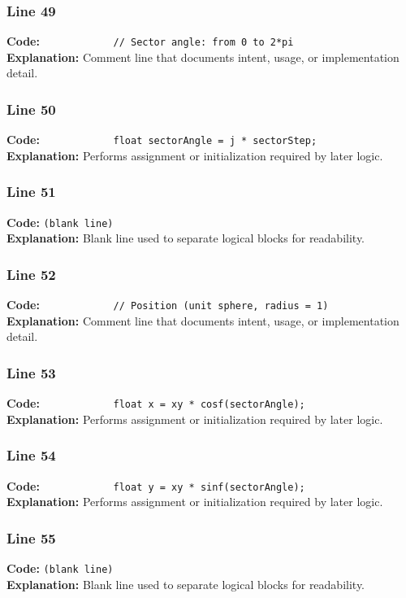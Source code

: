 \documentclass[11pt,a4paper]{article}
\begin{document}
\subsubsection*{Line 49}
\textbf{Code:} \verb|            // Sector angle: from 0 to 2*pi|\\
\textbf{Explanation:} Comment line that documents intent, usage, or implementation detail.

\subsubsection*{Line 50}
\textbf{Code:} \verb|            float sectorAngle = j * sectorStep;|\\
\textbf{Explanation:} Performs assignment or initialization required by later logic.

\subsubsection*{Line 51}
\textbf{Code:} \texttt{(blank line)}\\
\textbf{Explanation:} Blank line used to separate logical blocks for readability.

\subsubsection*{Line 52}
\textbf{Code:} \verb|            // Position (unit sphere, radius = 1)|\\
\textbf{Explanation:} Comment line that documents intent, usage, or implementation detail.

\subsubsection*{Line 53}
\textbf{Code:} \verb|            float x = xy * cosf(sectorAngle);|\\
\textbf{Explanation:} Performs assignment or initialization required by later logic.

\subsubsection*{Line 54}
\textbf{Code:} \verb|            float y = xy * sinf(sectorAngle);|\\
\textbf{Explanation:} Performs assignment or initialization required by later logic.

\subsubsection*{Line 55}
\textbf{Code:} \texttt{(blank line)}\\
\textbf{Explanation:} Blank line used to separate logical blocks for readability.
\end{document}
